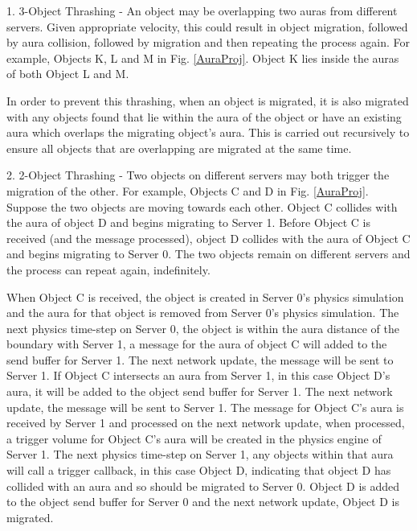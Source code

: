 1. 3-Object Thrashing - An object may be overlapping two auras from different servers. Given appropriate velocity, this could result in object migration, followed by aura collision, followed by migration and then repeating the process again. For example, Objects K, L and M in Fig. \ref{AuraProj}. Object K lies inside the auras of both Object L and M. 

In order to prevent this thrashing, when an object is migrated, it is also migrated with any objects found that lie within the aura of the object or have an existing aura which overlaps the migrating object's aura. This is carried out recursively to ensure all objects that are overlapping are migrated at the same time.

2. 2-Object Thrashing - Two objects on different servers may both trigger the migration of the other. For example, Objects C and D in Fig. \ref{AuraProj}. Suppose the two objects are moving towards each other. Object C collides with the aura of object D and begins migrating to Server 1. Before Object C is received (and the message processed), object D collides with the aura of Object C and begins migrating to Server 0. The two objects remain on different servers and the process can repeat again, indefinitely.

When Object C is received, the object is created in Server 0's physics simulation and the aura for that object is removed from Server 0's physics simulation. 
The next physics time-step on Server 0, the object is within the aura distance of the boundary with Server 1, a message for the aura of object C will added to the send buffer for Server 1. The next network update, the message will be sent to Server 1.
If Object C intersects an aura from Server 1, in this case Object D's aura, it will be added to the object send buffer for Server 1. The next network update, the message will be sent to Server 1. %
The message for Object C's aura is received by Server 1 and processed on the next network update, when processed, a trigger volume for Object C's aura will be created in the physics engine of Server 1. The next physics time-step on Server 1, any objects within that aura will call a trigger callback, in this case Object D, indicating that object D has collided with an aura and so should be migrated to Server 0. Object D is added to the object send buffer for Server 0 and the next network update, Object D is migrated.



